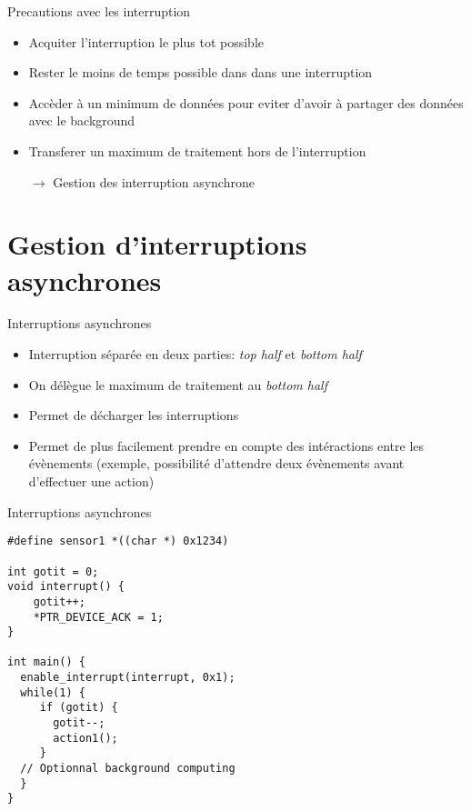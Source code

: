\begin{frame}{Precautions avec les interruption}
  \begin{itemize} 
  \item Acquiter l'interruption le plus tot possible
  \item Rester le moins de temps possible dans dans une interruption
  \item Accèder à un minimum de données pour eviter d'avoir à partager
    des données avec le background
  \item Transferer un maximum de traitement hors de l'interruption
  \item[$\rightarrow$] Gestion des interruption asynchrone
  \end{itemize} 
\end{frame} 

\section{Gestion d'interruptions asynchrones} 

\begin{frame}[fragile]{Interruptions asynchrones}
  \begin{itemize} 
  \item  Interruption  séparée en  deux  parties:  \emph{top half}  et
    \emph{bottom half}
  \item On délègue le maximum de traitement au \emph{bottom half}
  \item Permet de décharger les interruptions
  \item Permet  de plus facilement prendre en  compte des intéractions
    entre  les   évènements  (exemple,  possibilité   d'attendre  deux
    évènements avant d'effectuer une action)
  \end{itemize}
\end{frame}

\begin{frame}[fragile]{Interruptions asynchrones}
  \begin{lstlisting} 
#define sensor1 *((char *) 0x1234)

int gotit = 0;
void interrupt() {
    gotit++;
    *PTR_DEVICE_ACK = 1;
}

int main() {
  enable_interrupt(interrupt, 0x1);
  while(1) {
     if (gotit) {
       gotit--;
       action1();
     }
  // Optionnal background computing 
  }
}
  \end{lstlisting} 
\end{frame} 

